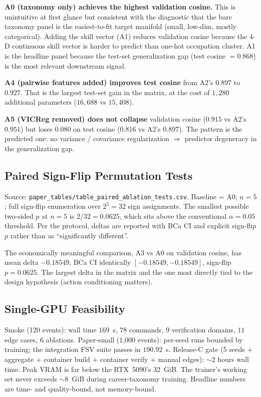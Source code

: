 \documentclass[10pt,twocolumn,letterpaper]{article}
\newcommand{\code}[1]{\texttt{\small #1}}
\begin{document}
\textbf{A0 (taxonomy only) achieves the highest validation cosine.}
This is unintuitive at first glance but consistent with the
diagnostic that the bare taxonomy panel is the easiest-to-fit
target manifold (small, low-dim, mostly categorical). Adding the
skill vector (A1) reduces validation cosine because the 4-D
continuous skill vector is harder to predict than one-hot
occupation cluster. A1 is the headline panel because the test-set
generalization gap (test cosine $= 0.868$) is the most relevant
downstream signal.

\textbf{A4 (pairwise features added) improves test cosine} from
A2's $0.897$ to $0.927$. That is the largest test-set gain in the
matrix, at the cost of $1{,}280$ additional parameters
($16{,}688$ vs $15{,}408$).

\textbf{A5 (VICReg removed) does not collapse} validation cosine
($0.915$ vs A2's $0.951$) but loses $0.080$ on test cosine
($0.816$ vs A2's $0.897$). The pattern is the predicted one: no
variance / covariance regularization $\Rightarrow$ predictor
degeneracy in the generalization gap.

\subsection{Paired Sign-Flip Permutation Tests}

Source:
\code{paper\_tables/table\_paired\_ablation\_tests.csv}.
Baseline = A0; $n=5$; full sign-flip enumeration over $2^5=32$
sign assignments. The smallest possible two-sided $p$ at $n=5$ is
$2/32 = 0.0625$, which sits above the conventional
$\alpha=0.05$ threshold.
Per the protocol, deltas are reported with BCa CI and explicit
sign-flip $p$ rather than as ``significantly different''.

The economically meaningful comparison, A3 vs A0 on validation
cosine, has mean delta $-0.18549$, BCa CI identically
\([-0.18549, -0.18549]\), sign-flip $p = 0.0625$. The largest delta
in the matrix and the one most directly tied to the design
hypothesis (action conditioning matters).

\subsection{Single-GPU Feasibility}

Smoke (120 events): wall time $169$~s, $78$ commands, $9$
verification domains, $11$ edge cases, $6$ ablations. Paper-small
(1{,}000 events): per-seed runs bounded by training; the
integration FSV suite passes in $190.92$~s. Release-C gate
(5 seeds + aggregate + container build + container verify + manual
edges): $\sim$2 hours wall time. Peak VRAM is far below the RTX~5090's
$32$~GiB. The trainer's working set never exceeds $\sim$8~GiB
during career-taxonomy training. Headline numbers are time- and
quality-bound, not memory-bound.
\end{document}
